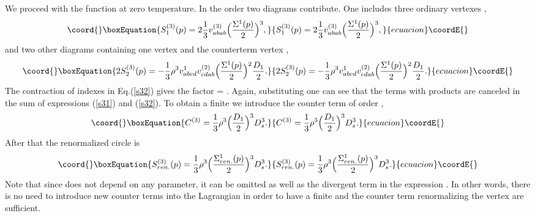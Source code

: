 \documentclass[a4paper,12pt]{article}
\begin{document}
We proceed with the function \coordHE{} at zero temperature.  In the
order \coordHE{} two diagrams contribute. One includes three ordinary
vertexes \coordHE{},
\begin{equation}\coord{}\boxEquation{ \label{s31}
S^{(3)}_1(p) = 2 \frac{1}{3}
v^{(3)}_{abab}\Bigl(\frac{\Sigma^1(p)}{2}\Bigr)^3,
}{ S^{(3)}_1(p) = 2 \frac{1}{3}
v^{(3)}_{abab}\Bigl(\frac{\Sigma^1(p)}{2}\Bigr)^3,
}{ecuacion}\coordE{}\end{equation}
and two other diagrams containing one vertex \coordHE{} and the
counterterm vertex \coordHE{},
\begin{equation}\coord{}\boxEquation{ \label{s32}
2 S^{(3)}_2(p) = - \frac{1}{3}\rho^3 v^1_{abcd}
v^{(2)}_{cdab}\Bigl(\frac{\Sigma^1(p)}{2}\Bigr)^2 \frac{D_1}{2}.
}{ 2 S^{(3)}_2(p) = - \frac{1}{3}\rho^3 v^1_{abcd}
v^{(2)}_{cdab}\Bigl(\frac{\Sigma^1(p)}{2}\Bigr)^2 \frac{D_1}{2}.
}{ecuacion}\coordE{}\end{equation}
The contraction of indexes in Eq.(\ref{s32}) gives the factor
\coordHE{} = \coordHE{}. Again, substituting
\coordHE{} one can see that the terms with
products \coordHE{} are canceled in the sum
of expressions (\ref{s31}) and (\ref{s32}). To obtain a finite
\coordHE{} we introduce the counter term of order \coordHE{},
\begin{equation}\coord{}\boxEquation{ \label{C3}
C^{(3)} = \frac{1}{3}\rho^3 \Bigl(\frac{D_1}{2}\Bigr)^3 D_s^3.
}{ C^{(3)} = \frac{1}{3}\rho^3 \Bigl(\frac{D_1}{2}\Bigr)^3 D_s^3.
}{ecuacion}\coordE{}\end{equation}
After that the renormalized circle \coordHE{} is
\begin{equation}\coord{}\boxEquation{ \label{s3r}
S^{(3)}_{ren.}(p) = \frac{1}{3}\rho^3
\Bigl(\frac{\Sigma^1_{ren.}(p)}{2}\Bigr)^3 D_s^3.
}{ S^{(3)}_{ren.}(p) = \frac{1}{3}\rho^3
\Bigl(\frac{\Sigma^1_{ren.}(p)}{2}\Bigr)^3 D_s^3.
}{ecuacion}\coordE{}\end{equation}
Note that since \coordHE{} does not depend on any parameter, it can be
omitted as well as the divergent term in the expression \coordHE{}. In
other words, there is no need to introduce new counter terms into the
Lagrangian in order to have a finite \coordHE{} and the counter term
renormalizing the vertex \coordHE{} are sufficient.
\end{document}
